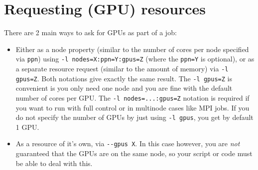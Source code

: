 


\section{Requesting (GPU) resources}
\label{sec:gpu_ugent_resources}

There are 2 main ways to ask for GPUs as part of a job:

\begin{itemize}
  \item Either as a node property (similar to the number of cores
  per node specified via \lstinline|ppn|) using \lstinline|-l nodes=X:ppn=Y:gpus=Z| (where the \lstinline|ppn=Y| is optional),
  or as a separate resource request (similar to the amount of memory) via \lstinline|-l gpus=Z|.
  Both notations give exactly the same result.
  The \lstinline|-l gpus=Z| is convenient is you only need one
  node and you are fine with the default number of cores per GPU.
  The \lstinline|-l nodes=...:gpus=Z| notation is required if you want to run with full control or in multinode cases like MPI jobs.
  If you do not specify the number of GPUs by just using \lstinline|-l gpus|, you get by default 1 GPU.
\item As a resource of it's own, via \lstinline|--gpus X|.
  In this case however, you are \emph{not} guaranteed that the GPUs are on the same node,
  so your script or code must be able to deal with this.
\end{itemize}

